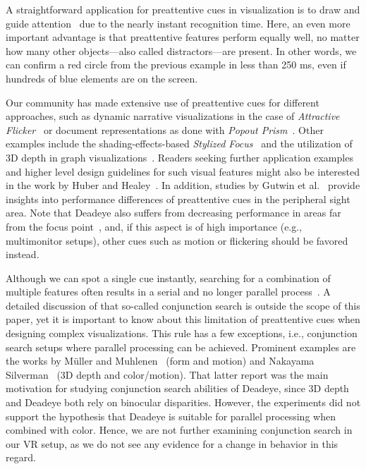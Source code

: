 \documentclass[journal]{vgtc}                %
\begin{document}
A straightforward application for preattentive cues in visualization is to draw and guide attention~\cite{ware2012information,Hall:2016:FEI,Borji:2013:SAV} due to the nearly instant recognition time. Here, an even more important advantage is that preattentive features perform equally well, no matter how many other objects---also called distractors---are present. In other words, we can confirm a red circle from the previous example in less than 250 ms, even if hundreds of blue elements are on the screen.





Our community has made extensive use of preattentive cues for different approaches, such as dynamic narrative visualizations in the case of \textit{Attractive Flicker}~\cite{Waldner:2014:AFG} or document representations as done with \textit{Popout Prism}~\cite{Suh:2002:PPA:503376.503422}. Other examples include the shading-effects-based \textit{Stylized Focus}~\cite{Cole:2006:DGM:2383894.2383942} and the utilization of 3D depth in graph visualizations~\cite{Alper:2011:SHG:2068462.2068634}. Readers seeking further application examples and higher level design guidelines for such visual features might also be interested in the work by Huber and Healey~\cite{huber2005visualizing}. In addition, studies by Gutwin et al.~\cite{Gutwin:2017:PPI:3025453.3025984} provide insights into performance differences of preattentive cues in the peripheral sight area. Note that Deadeye also suffers from decreasing performance in areas far from the focus point~\cite{krekhov2019deadeye}, and, if this aspect is of high importance (e.g., multimonitor setups), other cues such as motion or flickering should be favored instead.

Although we can spot a single cue instantly, searching for a combination of multiple features often results in a serial and no longer parallel process~\cite{treisman1980feature, treisman1988feature, treisman1986illusory,wolfe1989guided,townsend1990serial,mcleod1988visual}. A detailed discussion of that so-called conjunction search is outside the scope of this paper, yet it is important to know about this limitation of preattentive cues when designing complex visualizations. This rule has a few exceptions, i.e., conjunction search setups where parallel processing can be achieved. Prominent examples are the works by M\"uller and Muhlenen~\cite{muller1999visual} (form and motion) and Nakayama Silverman~\cite{nakayama1986serial} (3D depth and color/motion). That latter report was the main motivation for studying conjunction search abilities of Deadeye, since 3D depth and Deadeye both rely on binocular disparities. However, the experiments did not support the hypothesis that Deadeye is suitable for parallel processing when combined with color. Hence, we are not further examining conjunction search in our VR setup, as we do not see any evidence for a change in behavior in this regard.
\end{document}
